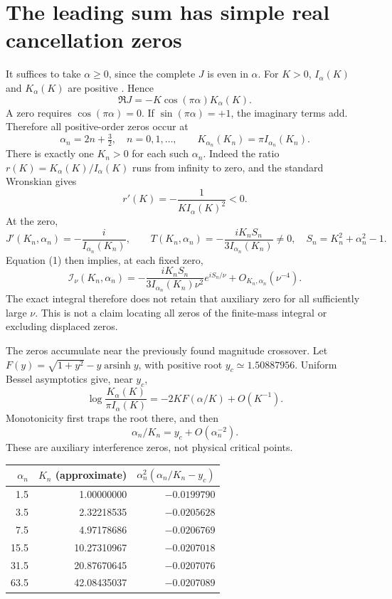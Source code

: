 \documentclass[11pt,a4paper]{article}
\begin{document}
\newpage
\section{The leading sum has simple real cancellation zeros}
It suffices to take \(\alpha\ge0\), since the complete \(J\) is even
in \(\alpha\). For \(K>0\), \(I_\alpha(K)\) and \(K_\alpha(K)\) are
positive \cite{limits}. Hence
\[
 \Re J=-K\cos(\pi\alpha)K_\alpha(K).
\]
A zero requires \(\cos(\pi\alpha)=0\). If \(\sin(\pi\alpha)=+1\),
the imaginary terms add. Therefore all positive-order zeros occur at
\[
 \alpha_n=2n+\tfrac32,\quad n=0,1,\ldots,\qquad
 K_{\alpha_n}(K_n)=\pi I_{\alpha_n}(K_n). \tag{5}
\]
There is exactly one \(K_n>0\) for each such \(\alpha_n\).
Indeed the ratio \(r(K)=K_\alpha(K)/I_\alpha(K)\) runs from infinity
to zero, and the standard Wronskian \cite{wronskian} gives
\[
 r'(K)=-\frac1{K I_\alpha(K)^2}<0.
\]
At the zero,
\[
 J'(K_n,\alpha_n)=-\frac{i}{I_{\alpha_n}(K_n)},\qquad
 T(K_n,\alpha_n)=-\frac{iK_nS_n}{3I_{\alpha_n}(K_n)}\ne0,
 \quad S_n=K_n^2+\alpha_n^2-1. \tag{6}
\]
Equation (1) then implies, at each fixed zero,
\[
 \mathcal I_\nu(K_n,\alpha_n)
 =-\frac{iK_nS_n}{3I_{\alpha_n}(K_n)\nu^2}
 e^{iS_n/\nu}+O_{K_n,\alpha_n}(\nu^{-4}). \tag{7}
\]
The exact integral therefore does not retain that auxiliary zero for
all sufficiently large \(\nu\). This is not a claim locating all
zeros of the finite-mass integral or excluding displaced zeros.

The zeros accumulate near the previously found magnitude crossover.
Let \(F(y)=\sqrt{1+y^2}-y\operatorname{arsinh}y\), with
positive root \(y_c\simeq1.50887956\).
Uniform Bessel asymptotics \cite{order} give, near \(y_c\),
\[
\log\frac{K_\alpha(K)}{\pi I_\alpha(K)}
=-2KF(\alpha/K)+O(K^{-1}).
\]
Monotonicity first traps the root there, and then
\[
 \alpha_n/K_n=y_c+O(\alpha_n^{-2}). \tag{8}
\]
These are auxiliary interference zeros, not physical critical points.

\begin{center}\begin{tabular}{rrr}\toprule
\(\alpha_n\)&\(K_n\) (approximate)&
\(\alpha_n^2(\alpha_n/K_n-y_c)\)\\\midrule
1.5&1.00000000&\(-0.0199790\)\\
3.5&2.32218535&\(-0.0205628\)\\
7.5&4.97178686&\(-0.0206769\)\\
15.5&10.27310967&\(-0.0207018\)\\
31.5&20.87670645&\(-0.0207076\)\\
63.5&42.08435037&\(-0.0207089\)\\\bottomrule
\end{tabular}\end{center}
\end{document}

